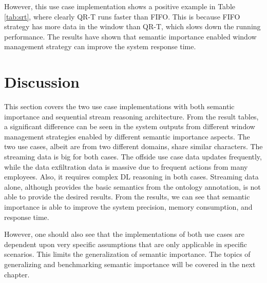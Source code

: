 However, this use case implementation shows a positive example in Table \ref{tab:srt}, where clearly QR-T runs faster than FIFO. 
This is because FIFO strategy has more data in the window than QR-T, which slows down the running performance.
The results have shown that semantic importance enabled window management strategy can improve the system response time. 
%
\section{Discussion}
This section covers the two use case implementations with both semantic importance and sequential stream reasoning architecture.
From the result tables, a significant difference can be seen in the system outputs from different window management strategies enabled by different semantic importance aspects. 
The two use cases, albeit are from two different domains, share similar characters. 
The streaming data is big for both cases. 
The offside use case data updates frequently, while the data exfiltration data is massive due to frequent actions from many employees. 
Also, it requires complex DL reasoning in both cases. 
Streaming data alone, although provides the basic semantics from the ontology annotation, is not able to provide the desired results. 
From the results, we can see that semantic importance is able to improve the system precision, memory consumption, and response time.

However, one should also see that the implementations of both use cases are dependent upon very specific assumptions that are only applicable in specific scenarios.
This limits the generalization of semantic importance. 
The topics of generalizing and benchmarking semantic importance will be covered in the next chapter. 